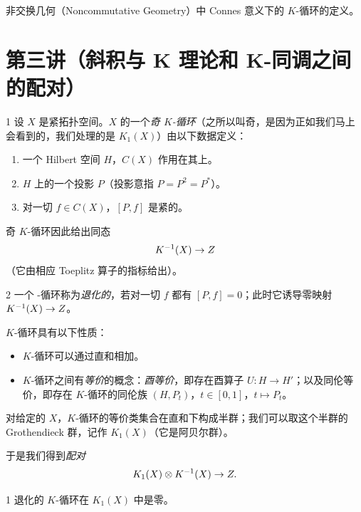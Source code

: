 非交换几何（Noncommutative Geometry）中 Connes 意义下的 $K$-循环的定义。


\section{第三讲（斜积与 K 理论和 K-同调之间的配对）}

\begin{defn}{1}
设 $X$ 是紧拓扑空间。$X$ 的一个\emph{奇 $K$-循环}（之所以叫奇，是因为正如我们马上会看到的，我们处理的是 $K_1(X)$）由以下数据定义：
\begin{enumerate}[label=\alph*.]
\item 一个 Hilbert 空间 $H$，$C(X)$ 作用在其上。
\item $H$ 上的一个投影 $P$（投影意指 $P=P^2=P^*$）。
\item 对一切 $f\in C(X)$，$[P,f]$ 是紧的。
\end{enumerate}
奇 $K$-循环因此给出同态
\[ K^{-1}(X)\to Z \]
（它由相应 Toeplitz 算子的指标给出）。
\end{defn}

\begin{defn}{2}
一个 -循环称为\emph{退化的}，若对一切 $f$ 都有 $[P,f]=0$；此时它诱导零映射 $K^{-1}(X)\to Z$。
\end{defn}


$K$-循环具有以下性质：

\begin{itemize}[leftmargin=1.6em,itemsep=2pt]
\item $K$-循环可以通过直和相加。
\item $K$-循环之间有\emph{等价}的概念：\emph{酉等价}，即存在酉算子 $U: H\to H'$；以及同伦等价，即存在 $K$-循环的同伦族 $(H,P_t)$，$t\in[0,1]$，$t\mapsto P_t$。
\end{itemize}

对给定的 $X$，$K$-循环的等价类集合在直和下构成半群；我们可以取这个半群的 Grothendieck 群，记作 $K_1(X)$（它是阿贝尔群）。

于是我们得到\emph{配对}
\[ K_1(X)\otimes K^{-1}(X)\to Z. \]

\begin{lem}{1}
退化的 $K$-循环在 $K_1(X)$ 中是零。
\end{lem}

